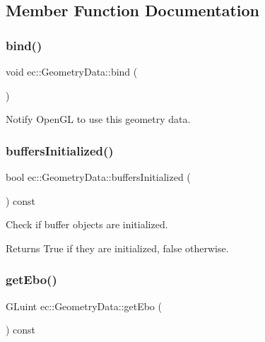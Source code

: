 \subsection{Member Function Documentation}
\mbox{\label{classec_1_1_geometry_data_acb50971e6fbd928172731a3427d22691}} 
\subsubsection{\texorpdfstring{bind()}{bind()}}
{\footnotesize\ttfamily void ec\+::\+Geometry\+Data\+::bind (\begin{DoxyParamCaption}{ }\end{DoxyParamCaption})}



Notify Open\+GL to use this geometry data. 

\mbox{\label{classec_1_1_geometry_data_a23c0090061b5b21b74f070916915ca69}} 
\subsubsection{\texorpdfstring{buffers\+Initialized()}{buffersInitialized()}}
{\footnotesize\ttfamily bool ec\+::\+Geometry\+Data\+::buffers\+Initialized (\begin{DoxyParamCaption}{ }\end{DoxyParamCaption}) const}



Check if buffer objects are initialized. 

\begin{DoxyReturn}{Returns}
True if they are initialized, false otherwise. 
\end{DoxyReturn}
\mbox{\label{classec_1_1_geometry_data_ae3f427f933c595b169bd10551d52abc3}} 
\subsubsection{\texorpdfstring{get\+Ebo()}{getEbo()}}
{\footnotesize\ttfamily G\+Luint ec\+::\+Geometry\+Data\+::get\+Ebo (\begin{DoxyParamCaption}{ }\end{DoxyParamCaption}) const}



